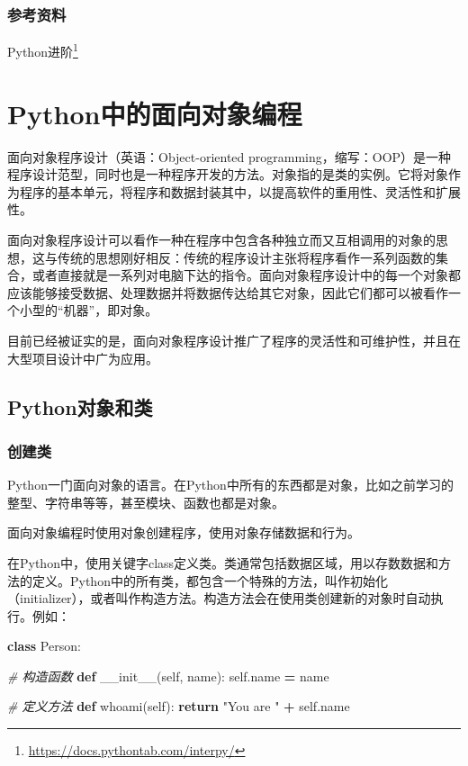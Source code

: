 \documentclass[]{ctexbook}
\newenvironment{Shaded}{\begin{snugshade}}{\end{snugshade}}
\newcommand{\CommentTok}[1]{\textcolor[rgb]{0.56,0.35,0.01}{\textit{#1}}}
\newcommand{\ControlFlowTok}[1]{\textcolor[rgb]{0.13,0.29,0.53}{\textbf{#1}}}
\newcommand{\FunctionTok}[1]{\textcolor[rgb]{0.00,0.00,0.00}{#1}}
\newcommand{\KeywordTok}[1]{\textcolor[rgb]{0.13,0.29,0.53}{\textbf{#1}}}
\newcommand{\NormalTok}[1]{#1}
\newcommand{\OperatorTok}[1]{\textcolor[rgb]{0.81,0.36,0.00}{\textbf{#1}}}
\newcommand{\StringTok}[1]{\textcolor[rgb]{0.31,0.60,0.02}{#1}}
\newcommand{\VariableTok}[1]{\textcolor[rgb]{0.00,0.00,0.00}{#1}}
\renewcommand{\href}[2]{#2\footnote{\url{#1}}}
\begin{document}
\hypertarget{ux53c2ux8003ux8d44ux6599}{%
\subsection{参考资料}\label{ux53c2ux8003ux8d44ux6599}}

\href{https://docs.pythontab.com/interpy/}{Python进阶}

\hypertarget{oop}{%
\chapter{Python中的面向对象编程}\label{oop}}

面向对象程序设计（英语：Object-oriented programming，缩写：OOP）是一种程序设计范型，同时也是一种程序开发的方法。对象指的是类的实例。它将对象作为程序的基本单元，将程序和数据封装其中，以提高软件的重用性、灵活性和扩展性。

面向对象程序设计可以看作一种在程序中包含各种独立而又互相调用的对象的思想，这与传统的思想刚好相反：传统的程序设计主张将程序看作一系列函数的集合，或者直接就是一系列对电脑下达的指令。面向对象程序设计中的每一个对象都应该能够接受数据、处理数据并将数据传达给其它对象，因此它们都可以被看作一个小型的``机器''，即对象。

目前已经被证实的是，面向对象程序设计推广了程序的灵活性和可维护性，并且在大型项目设计中广为应用。

\hypertarget{pythonux5bf9ux8c61ux548cux7c7b}{%
\section{Python对象和类}\label{pythonux5bf9ux8c61ux548cux7c7b}}

\hypertarget{ux521bux5efaux7c7b}{%
\subsection{创建类}\label{ux521bux5efaux7c7b}}

Python一门面向对象的语言。在Python中所有的东西都是对象，比如之前学习的整型、字符串等等，甚至模块、函数也都是对象。

面向对象编程时使用对象创建程序，使用对象存储数据和行为。

在Python中，使用关键字class定义类。类通常包括数据区域，用以存数数据和方法的定义。Python中的所有类，都包含一个特殊的方法，叫作初始化（initializer），或者叫作构造方法。构造方法会在使用类创建新的对象时自动执行。例如：

\begin{Shaded}
\begin{Highlighting}[]
\KeywordTok{class}\NormalTok{ Person:}

      \CommentTok{# 构造函数}
      \KeywordTok{def} \FunctionTok{__init__}\NormalTok{(}\VariableTok{self}\NormalTok{, name):}
            \VariableTok{self}\NormalTok{.name }\OperatorTok{=}\NormalTok{ name}

      \CommentTok{# 定义方法}
     \KeywordTok{def}\NormalTok{ whoami(}\VariableTok{self}\NormalTok{):}
           \ControlFlowTok{return} \StringTok{"You are "} \OperatorTok{+} \VariableTok{self}\NormalTok{.name}
\end{Highlighting}
\end{Shaded}
\end{document}
